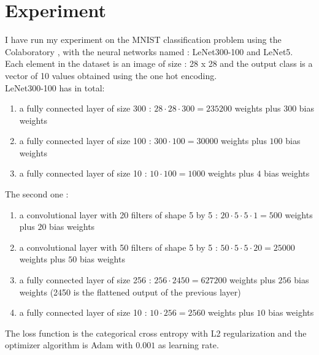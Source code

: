\documentclass[journal]{vgtc}                %
\begin{document}
\section{Experiment}
I have run my experiment on the MNIST classification problem using the Colaboratory , with the neural networks named : LeNet300-100 and LeNet5.\\Each element in the dataset is an image of size : 28 x 28 and the output class is a vector of 10 values obtained using the one hot encoding.\\LeNet300-100 has in total:
\begin{enumerate}
\item  a fully connected layer of size 300 : $28\cdot 28 \cdot 300 = 235200$ weights plus $300$ bias weights
\item  a fully connected layer of size 100 : $300\cdot 100 = 30000$ weights plus $100$ bias weights
\item  a fully connected layer of size 10 : $10\cdot 100 = 1000$ weights plus $4$ bias weights
\end{enumerate}
The second one :
\begin{enumerate}
\item  a convolutional layer with 20 filters of shape 5 by 5 : $20\cdot 5 \cdot 5 \cdot 1= 500$ weights plus $20$ bias weights
\item  a convolutional layer with 50 filters of shape 5 by 5 : $50\cdot 5 \cdot 5 \cdot 20= 25000$ weights plus $50$ bias weights
\item  a fully connected layer of size 256 : $256\cdot 2450 = 627200$ weights plus $256$ bias weights (2450 is the flattened output of the previous layer)
\item a fully connected layer of size 10 : $10\cdot256=2560$ weights plus $10$ bias weights
\end{enumerate}
The loss function is the categorical cross entropy with L2 regularization and the optimizer algorithm is Adam with $0.001$ as learning rate.
\end{document}
